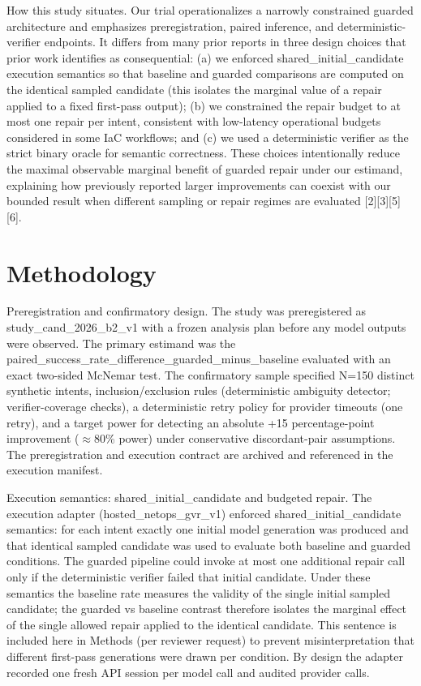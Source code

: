 \documentclass[conference]{IEEEtran}
\begin{document}
How this study situates. Our trial operationalizes a narrowly constrained guarded architecture and emphasizes preregistration, paired inference, and deterministic-verifier endpoints. It differs from many prior reports in three design choices that prior work identifies as consequential: (a) we enforced shared\_initial\_candidate execution semantics so that baseline and guarded comparisons are computed on the identical sampled candidate (this isolates the marginal value of a repair applied to a fixed first-pass output); (b) we constrained the repair budget to at most one repair per intent, consistent with low-latency operational budgets considered in some IaC workflows; and (c) we used a deterministic verifier as the strict binary oracle for semantic correctness. These choices intentionally reduce the maximal observable marginal benefit of guarded repair under our estimand, explaining how previously reported larger improvements can coexist with our bounded result when different sampling or repair regimes are evaluated [2][3][5][6].

\section{Methodology}
Preregistration and confirmatory design. The study was preregistered as study\_cand\_2026\_b2\_v1 with a frozen analysis plan before any model outputs were observed. The primary estimand was the paired\_success\_rate\_difference\_guarded\_minus\_baseline evaluated with an exact two-sided McNemar test. The confirmatory sample specified N=150 distinct synthetic intents, inclusion/exclusion rules (deterministic ambiguity detector; verifier-coverage checks), a deterministic retry policy for provider timeouts (one retry), and a target power for detecting an absolute +15 percentage-point improvement (\ensuremath{\approx}80\% power) under conservative discordant-pair assumptions. The preregistration and execution contract are archived and referenced in the execution manifest.

Execution semantics: shared\_initial\_candidate and budgeted repair. The execution adapter (hosted\_netops\_gvr\_v1) enforced shared\_initial\_candidate semantics: for each intent exactly one initial model generation was produced and that identical sampled candidate was used to evaluate both baseline and guarded conditions. The guarded pipeline could invoke at most one additional repair call only if the deterministic verifier failed that initial candidate. Under these semantics the baseline rate measures the validity of the single initial sampled candidate; the guarded vs baseline contrast therefore isolates the marginal effect of the single allowed repair applied to the identical candidate. This sentence is included here in Methods (per reviewer request) to prevent misinterpretation that different first-pass generations were drawn per condition. By design the adapter recorded one fresh API session per model call and audited provider calls.
\end{document}
